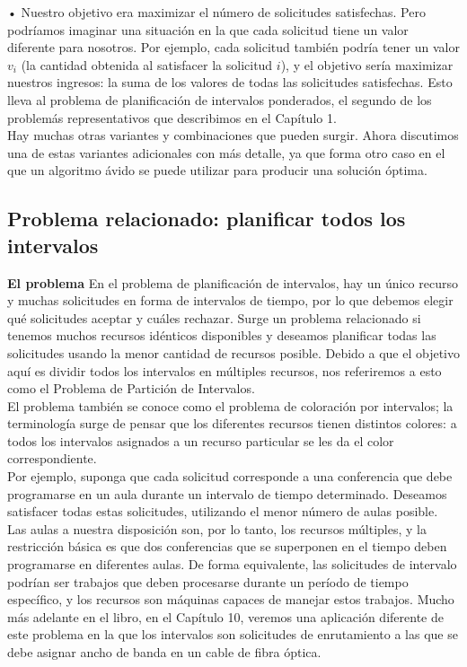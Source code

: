 \documentclass[a4paper]{article}
\begin{document}
    • Nuestro objetivo era maximizar el número de solicitudes satisfechas. Pero podríamos imaginar una situación en la que cada solicitud tiene un valor diferente para nosotros. Por ejemplo, cada solicitud también podría tener un valor $v_i$ (la cantidad obtenida al satisfacer la solicitud $i$), y el objetivo sería maximizar nuestros ingresos: la suma de los valores de todas las solicitudes satisfechas. Esto lleva al problema de planificación de intervalos ponderados, el segundo de los problemás representativos que describimos en el Capítulo 1.\\

Hay muchas otras variantes y combinaciones que pueden surgir. Ahora discutimos una de estas variantes adicionales con más detalle, ya que forma otro caso en el que un algoritmo ávido se puede utilizar para producir una solución óptima.\\

\subsection{Problema relacionado: planificar todos los intervalos}

\textbf{El problema} En el problema de planificación de intervalos, hay un único recurso y muchas solicitudes en forma de intervalos de tiempo, por lo que debemos elegir qué solicitudes aceptar y cuáles rechazar. Surge un problema relacionado si tenemos muchos recursos idénticos disponibles y deseamos planificar todas las solicitudes usando la menor cantidad de recursos posible. Debido a que el objetivo aquí es dividir todos los intervalos en múltiples recursos, nos referiremos a esto como el Problema de Partición de Intervalos.\\

El problema también se conoce como el problema de coloración por intervalos; la terminología surge de pensar que los diferentes recursos tienen distintos colores: a todos los intervalos asignados a un recurso particular se les da el color correspondiente.\\

Por ejemplo, suponga que cada solicitud corresponde a una conferencia que debe programarse en un aula durante un intervalo de tiempo determinado. Deseamos satisfacer todas estas solicitudes, utilizando el menor número de aulas posible. Las aulas a nuestra disposición son, por lo tanto, los recursos múltiples, y la restricción básica es que dos conferencias que se superponen en el tiempo deben programarse en diferentes aulas. De forma equivalente, las solicitudes de intervalo podrían ser trabajos que deben procesarse durante un período de tiempo específico, y los recursos son máquinas capaces de manejar estos trabajos. Mucho más adelante en el libro, en el Capítulo 10, veremos una aplicación diferente de este problema en la que los intervalos son solicitudes de enrutamiento a las que se debe asignar ancho de banda en un cable de fibra óptica. \\
\end{document}
